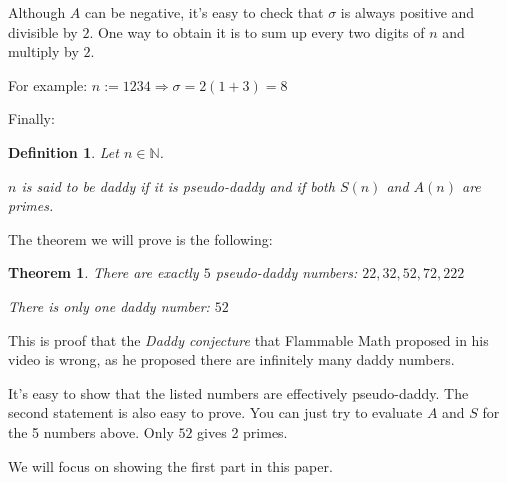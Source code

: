 \documentclass[a4paper, 11pt]{report}
\newtheorem{definition}{Definition}
\newtheorem{theorem}{Theorem}
\begin{document}
	Although $A$ can be negative, it's easy to check that $\sigma$ is always positive and divisible by $2$. One way to obtain it is to sum up every two digits of $n$ and multiply by $2$.
		
	For example: $n:=1234\Rightarrow \sigma=2(1+3)=8$
	
	Finally:
	
	\begin{definition}
		Let $n\in\mathbb{N}$.
		
		$n$ is said to be \emph{daddy} if it is pseudo-daddy and if both $S(n)$ and $A(n)$ are primes.
		
	\end{definition}
	
	The theorem we will prove is the following:
	
	\begin{theorem}
		There are exactly $5$ pseudo-daddy numbers:
		$22,32,52,72,222$
		
		There is only one daddy number: $52$
	\end{theorem}
	
	This is proof that the \emph{Daddy conjecture} that Flammable Math proposed in his video is wrong, as he proposed there are infinitely many daddy numbers.
	
	It's easy to show that the listed numbers are effectively pseudo-daddy. The second statement is also easy to prove. You can just try to evaluate $A$ and $S$ for the 5 numbers above. Only $52$ gives 2 primes.
	
	We will focus on showing the first part in this paper.

\newpage
\end{document}
